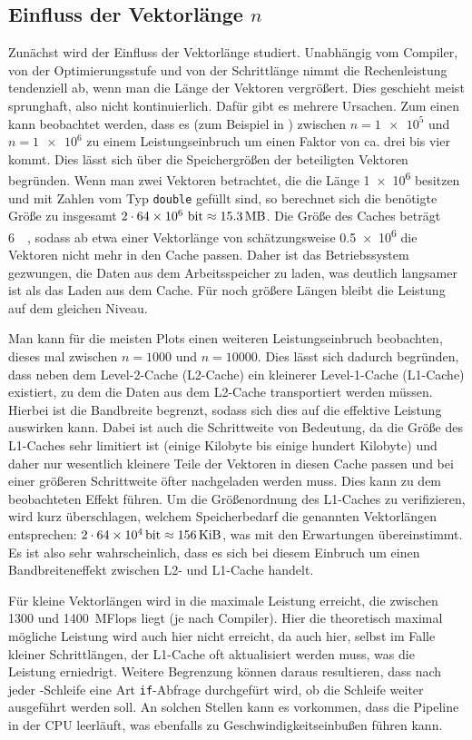 \subsection{Einfluss der Vektorlänge $n$}
Zunächst wird der Einfluss der Vektorlänge studiert. Unabhängig vom Compiler, von
der Optimierungsstufe und von der Schrittlänge nimmt die Rechenleistung tendenziell
ab, wenn man die Länge der Vektoren vergrößert. Dies geschieht meist sprunghaft,
also nicht kontinuierlich. Dafür gibt es mehrere Ursachen. Zum einen kann beobachtet
werden, dass es (zum Beispiel in ) zwischen $n=\num{1e5}$ und
$n=\num{1e6}$ zu einem Leistungseinbruch um einen Faktor von ca. drei bis vier kommt.
Dies lässt sich über die Speichergrößen der beteiligten Vektoren begründen. Wenn 
man zwei Vektoren betrachtet, die die Länge \num{1e6} besitzen und mit Zahlen vom Typ
\texttt{double} gefüllt sind, so berechnet sich die benötigte Größe zu insgesamt
$2\cdot \num{64e6}\mbox{~bit}\approx \SI{15.3}{\mega\byte}$. Die Größe des Caches 
beträgt \SI{6}{\mega\byte}, sodass ab etwa einer Vektorlänge von schätzungsweise \num{0.5e6} die 
Vektoren nicht mehr in den Cache passen. Daher ist das Betriebssystem gezwungen,
die Daten aus dem Arbeitsspeicher zu laden, was deutlich langsamer ist als das Laden
aus dem Cache. Für noch größere Längen bleibt die Leistung auf dem gleichen Niveau.

Man kann für die meisten Plots einen weiteren Leistungseinbruch beobachten, dieses
mal zwischen $n=1000$ und $n=10000$. Dies lässt sich dadurch begründen, dass neben
dem Level-2-Cache (L2-Cache) ein kleinerer Level-1-Cache (L1-Cache) existiert, zu
dem die Daten aus dem L2-Cache transportiert werden müssen. Hierbei ist die Bandbreite
begrenzt, sodass sich dies auf die effektive Leistung auswirken kann. Dabei ist auch
die Schrittweite von Bedeutung, da die Größe des L1-Caches sehr limitiert ist (einige
Kilobyte bis einige hundert Kilobyte) und daher nur wesentlich kleinere Teile der
Vektoren in diesen Cache passen und bei einer größeren Schrittweite öfter nachgeladen
werden muss. Dies kann zu dem beobachteten Effekt führen. Um die Größenordnung des
L1-Caches zu verifizieren, wird kurz überschlagen, welchem Speicherbedarf die
genannten Vektorlängen entsprechen: $2\cdot\SI{64e4}{\bit} \approx 
\SI{156}{\kibi\byte}$, was mit den Erwartungen übereinstimmt. Es ist also sehr
wahrscheinlich, dass es sich bei diesem Einbruch um einen Bandbreiteneffekt zwischen
L2- und L1-Cache handelt.

Für kleine Vektorlängen wird in die maximale Leistung erreicht, die zwischen 1300
und \SI{1400}{MFlops} liegt (je nach Compiler). Hier die theoretisch maximal mögliche 
Leistung wird auch hier nicht erreicht, da auch hier, selbst im Falle kleiner 
Schrittlängen, der L1-Cache oft aktualisiert werden muss, was die Leistung erniedrigt.
Weitere Begrenzung können daraus resultieren, dass nach jeder \for-Schleife eine 
Art \texttt{if}-Abfrage durchgefürt wird, ob die Schleife weiter ausgeführt werden
soll. An solchen Stellen kann es vorkommen, dass die Pipeline in der CPU leerläuft,
was ebenfalls zu Geschwindigkeitseinbußen führen kann.

